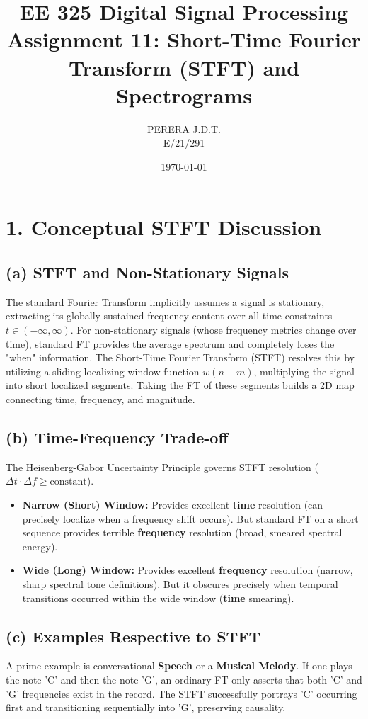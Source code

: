 \documentclass[11pt, a4paper]{article}
\title{EE 325 Digital Signal Processing \\ Assignment 11: Short-Time Fourier Transform (STFT) and Spectrograms}
\author{PERERA J.D.T. \\ E/21/291}
\date{\today}
\begin{document}
\maketitle

\section{1. Conceptual STFT Discussion}
\subsection{(a) STFT and Non-Stationary Signals}
The standard Fourier Transform implicitly assumes a signal is stationary, extracting its globally sustained frequency content over all time constraints $t \in (-\infty, \infty)$. For non-stationary signals (whose frequency metrics change over time), standard FT provides the average spectrum and completely loses the "when" information. The Short-Time Fourier Transform (STFT) resolves this by utilizing a sliding localizing window function $w(n-m)$, multiplying the signal into short localized segments. Taking the FT of these segments builds a 2D map connecting time, frequency, and magnitude.

\subsection{(b) Time-Frequency Trade-off}
The Heisenberg-Gabor Uncertainty Principle governs STFT resolution ($\Delta t \cdot \Delta f \ge \text{constant}$). 
\begin{itemize}
    \item \textbf{Narrow (Short) Window:} Provides excellent \textbf{time} resolution (can precisely localize when a frequency shift occurs). But standard FT on a short sequence provides terrible \textbf{frequency} resolution (broad, smeared spectral energy).
    \item \textbf{Wide (Long) Window:} Provides excellent \textbf{frequency} resolution (narrow, sharp spectral tone definitions). But it obscures precisely when temporal transitions occurred within the wide window (\textbf{time} smearing).
\end{itemize}

\subsection{(c) Examples Respective to STFT}
A prime example is conversational \textbf{Speech} or a \textbf{Musical Melody}. If one plays the note 'C' and then the note 'G', an ordinary FT only asserts that both 'C' and 'G' frequencies exist in the record. The STFT successfully portrays 'C' occurring first and transitioning sequentially into 'G', preserving causality.
\end{document}
